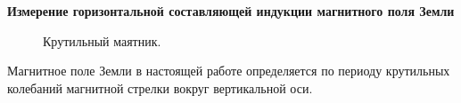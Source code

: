 \documentclass[a4paper, 12pt]{article}
\begin{document}
\textbf{
Измерение горизонтальной составляющей индукции магнитного поля Земли} 
\begin{figure}
\caption{Крутильный маятник.}
\label{ris:image}
\end{figure}
Магнитное поле Земли в настоящей работе определяется по периоду крутильных колебаний магнитной стрелки вокруг вертикальной оси.
\end{document}
